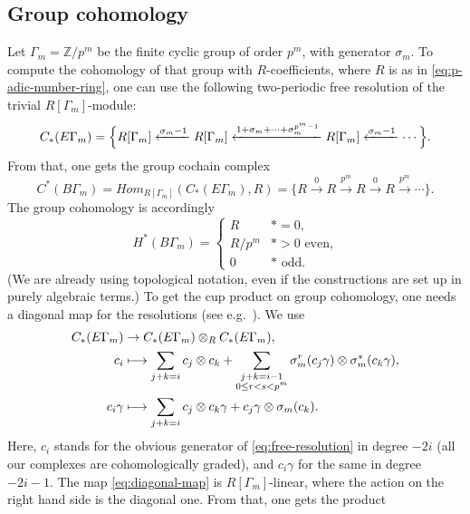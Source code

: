 \documentclass[10pt,a4paper]{amsart}
\providecommand{\eg}{e.g.\ }
\newcommand\mto{\mathchoice{\longmapsto}{\mapsto}{\mapsto}{\mapsto}}
\theoremstyle{plain}
\theoremstyle{definition}
\newcommand{\bZ}{{\mathbb Z}}
\begin{document}
\subsection{Group cohomology}
Let $\Gamma_m = \bZ/p^m$ be the finite cyclic group of order $p^m$, with generator $\sigma_m$. To compute the cohomology of that group with $R$-coefficients, where $R$ is as in \eqref{eq:p-adic-number-ring}, one can use the following two-periodic free resolution of the trivial $R[\Gamma_m]$-module:
\begin{equation} \label{eq:free-resolution}
C_*(E\Gamma_m) = \Bigl\{
R[\Gamma_m] \xleftarrow{\sigma_m-1} R[\Gamma_m] \xleftarrow{1+\sigma_m+\cdots+\sigma_m^{p^m-1}} R[\Gamma_m] \xleftarrow{\sigma_m-1} \cdots \Bigr\}.
\end{equation}
From that, one gets the group cochain complex
\begin{equation} \label{eq:standard-complex}
C^*(B\Gamma_m) =
\mathit{Hom}_{R[\Gamma_m]}(C_*(E\Gamma_m),R) =
\bigl\{ R \xrightarrow{0} R \xrightarrow{p^m} R \xrightarrow{0} R \xrightarrow{p^m} \cdots \bigr\}.
\end{equation}
The group cohomology is accordingly
\begin{equation*}
H^*(B\Gamma_m) = \begin{cases} R & \ast = 0, \\
R/p^m & \ast > 0 \text{ even,} \\
0 & \ast \text{ odd.}
\end{cases}
\end{equation*}
(We are already using topological notation, even if the constructions are set up in purely algebraic terms.) To get the cup product on group cohomology, one needs a diagonal map for the resolutions (see \eg \cite[Chap.\,5]{brown82}). We use
\begin{equation} \label{eq:diagonal-map}
\begin{aligned}
C_*(E\Gamma_m) &\to C_*(E\Gamma_m) \otimes_R C_*(E\Gamma_m), \\
c_i &\mto \sum_{j+k=i} c_j \otimes c_k + \sum_{\substack{j+k=i-1 \\ 0 \leq r<s < p^m}} \sigma_m^r( c_j\gamma) \otimes \sigma_m^s(c_k\gamma), \\
c_i \gamma &\mto \sum_{j+k=i} c_j \otimes c_k\gamma + c_j\gamma \otimes \sigma_m(c_k).
\end{aligned}
\end{equation}
Here, $c_i$ stands for the obvious generator of \eqref{eq:free-resolution} in degree $-2i$ (all our complexes are cohomologically graded), and $c_i\gamma$ for the same in degree $-2i-1$. The map \eqref{eq:diagonal-map} is $R[\Gamma_m]$-linear, where the action on the right hand side is the diagonal one. From that, one gets the product
\end{document}
